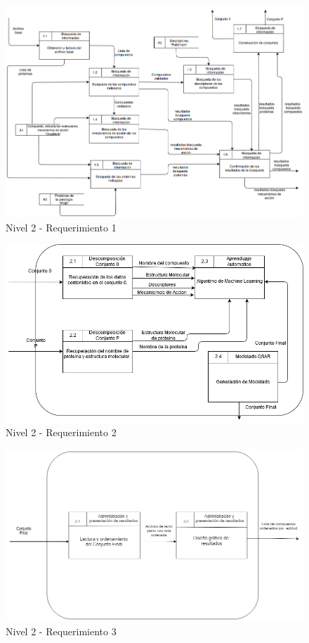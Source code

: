 \begin{figure}[H]
    \centering
    \includegraphics[scale=0.5]{Capitulo2/images/DFD-1.png}
    \caption{Nivel 2 - Requerimiento 1}
    \label{nivel_2_req1}
\end{figure}
\begin{figure}[H]
    \centering
    \includegraphics[scale=0.55]{Capitulo2/images/Req2.png}
    \caption{Nivel 2 - Requerimiento 2}
    \label{nivel_2_req2}
\end{figure}
\begin{figure}[H]
    \centering
    \includegraphics[scale=0.5]{Capitulo2/images/DFD-RF3.png}
    \caption{Nivel 2 - Requerimiento 3}
    \label{nivel_2_req3}
\end{figure}
